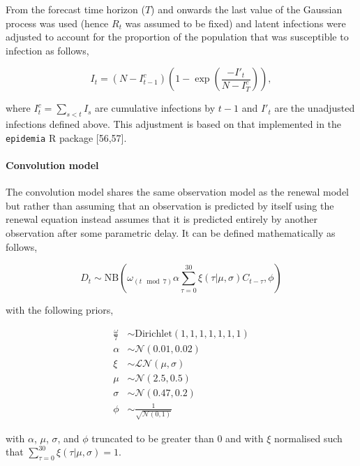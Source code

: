 \documentclass[10pt,letterpaper]{article}
\begin{document}
From the forecast time horizon (\(T\)) and onwards the last value of the
Gaussian process was used (hence \(R_t\) was assumed to be fixed) and
latent infections were adjusted to account for the proportion of the
population that was susceptible to infection as follows,

\begin{equation}
    I_t = (N - I^c_{t-1}) \left(1 - \exp \left(\frac{-I'_t}{N - I^c_{T}}\right)\right),
\end{equation}

where \(I^c_t = \sum_{s< t} I_s\) are cumulative infections by \(t-1\)
and \(I'_t\) are the unadjusted infections defined above. This
adjustment is based on that implemented in the \texttt{epidemia} R
package {[}56,57{]}.

\hypertarget{convolution-model}{%
\paragraph{Convolution model}\label{convolution-model}}

The convolution model shares the same observation model as the renewal
model but rather than assuming that an observation is predicted by
itself using the renewal equation instead assumes that it is predicted
entirely by another observation after some parametric delay. It can be
defined mathematically as follows,

\begin{equation} 
    D_{t} \sim \mathrm{NB}\left(\omega_{(t \mod 7)} \alpha \sum_{\tau = 0}^{30} \xi(\tau | \mu, \sigma) C_{t-\tau},  \phi \right)
\end{equation}

with the following priors,

\begin{align}
    \frac{\omega}{7} &\sim \mathrm{Dirichlet}(1, 1, 1, 1, 1, 1, 1) \\
    \alpha &\sim \mathcal{N}(0.01, 0.02) \\
    \xi &\sim \mathcal{LN}(\mu, \sigma) \\
    \mu &\sim \mathcal{N}(2.5, 0.5) \\
\sigma &\sim \mathcal{N}(0.47, 0.2) \\
\phi &\sim \frac{1}{\sqrt{\mathcal{N}(0, 1)}}
\end{align}

with \(\alpha\), \(\mu\), \(\sigma\), and \(\phi\) truncated to be
greater than 0 and with \(\xi\) normalised such that
\(\sum_{\tau = 0}^{30} \xi(\tau | \mu, \sigma) = 1\).
\end{document}
